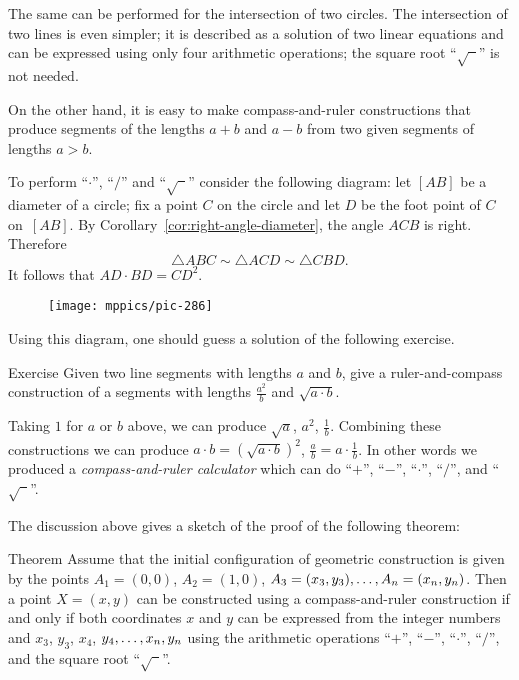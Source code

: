 The same can be performed for the intersection of two circles. 
The intersection of two lines is even simpler; 
it is described as a solution of two linear equations and can be expressed using only four arithmetic operations;
the square root ``$\sqrt{\phantom{a}}$'' is not needed.

\medskip

On the other hand, it is easy to make compass-and-ruler constructions that produce segments of the lengths $a+b$ and $a-b$ from two given segments of lengths $a>b$.

To perform ``$\cdot$'', ``$/$''
and ``$\sqrt{\phantom{a}}$'' consider the following diagram:
let $[AB]$ be a diameter of a circle; 
fix a point $C$ on the circle and let $D$ be the foot point of $C$ on~$[AB]$.
By Corollary~\ref{cor:right-angle-diameter}, the angle $ACB$ is right.
Therefore 
$$\triangle ABC\sim\triangle ACD\sim \triangle CBD.$$
It follows that $AD\cdot BD=CD^2$. 

{

\begin{wrapfigure}[7]{r}{37mm}
\vskip-0mm
\centering
\texttt{[image: mppics/pic-286]}
\end{wrapfigure}

Using this diagram, one should guess a solution of the following exercise.

\begin{thm}{Exercise}\label{ex:a2/b}
Given two line segments with lengths $a$ and $b$, give a ruler-and-compass construction of a segments with lengths $\tfrac {a^2}b$ and $\sqrt{a\cdot b}$.
\end{thm}

Taking $1$ for $a$ or $b$ above, we can produce 
$\sqrt a$, $a^2$, $\tfrac1b$.
Combining these constructions we can produce
$a\cdot b=(\sqrt{a\cdot b})^2$,
$\tfrac ab=a\cdot\tfrac 1b$.
In other words we produced a \emph{compass-and-ruler calculator} which can do ``$+$'', ``$-$'', ``$\cdot$'', ``$/$'', and ``$\sqrt{\phantom{a}}$''.

}

The discussion above gives a sketch of the proof of the following theorem:
 
\begin{thm}{Theorem}\label{thm:constructible-numbers}
Assume that the initial configuration of geometric construction is given by the points $A_1=(0,0)$, $A_2=(1,0)$, $A_3\z=(x_3,y_3),\z\dots,A_n=(x_n,y_n)$.
Then a point $X=(x,y)$ can be constructed using a compass-and-ruler construction
if and only if both coordinates $x$ and $y$ can be expressed from the integer numbers and $x_3$, $y_3$, $x_4$, $y_4,\z\dots,x_n,y_n$ using the arithmetic operations ``$+$'', ``$-$'', ``$\cdot$'', ``$/$'', and the square root ``$\sqrt{\phantom{a}}$''.
\end{thm}

